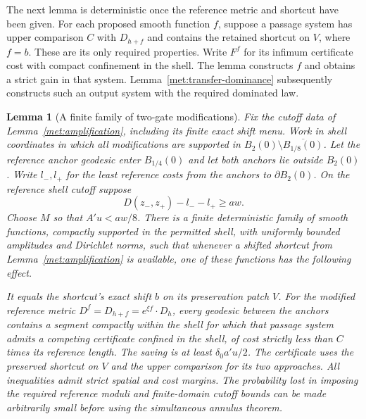 \documentclass[11pt]{article}
\numberwithin{equation}{section}
\newtheorem{lemma}[theorem]{Lemma}
\theoremstyle{definition}
\theoremstyle{remark}
\newcommand{\1}{\mathbf 1}
\begin{document}
The next lemma is deterministic once the reference metric and shortcut
have been given.  For each proposed smooth function $f$, suppose a
passage system has upper comparison $C$ with $D_{h+f}$ and contains
the retained shortcut on $V$, where $f=b$.  These are its only
required properties.  Write $F^f$ for its infimum certificate cost
with compact confinement in the shell.  The lemma constructs $f$
and obtains a strict gain in that system.  Lemma~\ref{met:transfer-dominance} subsequently
constructs such an output system with the required dominated law.

\begin{lemma}[A finite family of two-gate modifications]
\label{met:gate}
Fix the cutoff data of Lemma~\ref{met:amplification}, including its
finite exact shift menu.  Work in shell coordinates in which all
modifications are supported in
$B_2(0)\setminus\overline{B_{1/8}(0)}$.  Let the reference anchor
geodesic enter $B_{1/4}(0)$ and let both anchors lie outside $B_2(0)$.
Write $l_-,l_+$ for the least reference costs from the anchors to
$\partial B_2(0)$.  On the reference shell cutoff suppose
\begin{equation}
 D(z_-,z_+)-l_--l_+\geq aw.
 \label{met:landing-gap}
\end{equation}
Choose $M$ so that $A'u<aw/8$.  There is a finite deterministic family
of smooth functions, compactly supported in the permitted shell, with
uniformly bounded amplitudes and Dirichlet norms, such that whenever a
shifted shortcut from Lemma~\ref{met:amplification} is available, one
of these functions has the following effect.

It equals the shortcut's exact shift $b$ on its preservation patch
$V$.  For the modified reference metric
$D^f=D_{h+f}=e^{\xi f}\cdot D_h$, every geodesic between the anchors
contains a segment compactly within the shell for which that passage
system admits a competing certificate confined in the shell, of cost
strictly less than $C$ times its reference length.  The saving is at
least $\delta_0a'u/2$.  The certificate uses the preserved shortcut on
$V$ and the upper comparison for its two approaches.  All inequalities admit strict spatial and cost margins.
The probability lost in imposing the required reference moduli and
finite-domain cutoff bounds can be made arbitrarily small before
using the simultaneous annulus theorem.
\end{lemma}
\end{document}
